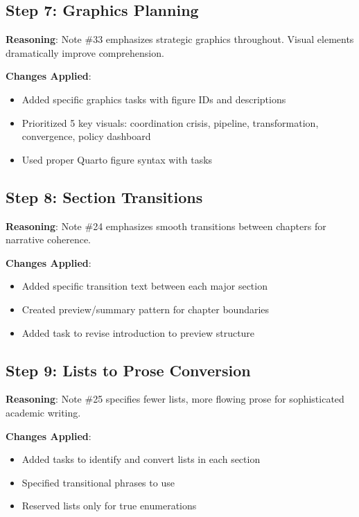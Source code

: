 \documentclass[
  11pt,
  letterpaper,
]{book}
\providecommand{\tightlist}{%
  \setlength{\itemsep}{0pt}\setlength{\parskip}{0pt}}
\begin{document}
\subsection{Step 7: Graphics Planning}\label{step-7-graphics-planning}

\textbf{Reasoning}: Note \#33 emphasizes strategic graphics throughout.
Visual elements dramatically improve comprehension.

\textbf{Changes Applied}:

\begin{itemize}
\tightlist
\item
  Added specific graphics tasks with figure IDs and descriptions
\item
  Prioritized 5 key visuals: coordination crisis, pipeline,
  transformation, convergence, policy dashboard
\item
  Used proper Quarto figure syntax with tasks
\end{itemize}

\subsection{Step 8: Section
Transitions}\label{step-8-section-transitions}

\textbf{Reasoning}: Note \#24 emphasizes smooth transitions between
chapters for narrative coherence.

\textbf{Changes Applied}:

\begin{itemize}
\tightlist
\item
  Added specific transition text between each major section
\item
  Created preview/summary pattern for chapter boundaries
\item
  Added task to revise introduction to preview structure
\end{itemize}

\subsection{Step 9: Lists to Prose
Conversion}\label{step-9-lists-to-prose-conversion}

\textbf{Reasoning}: Note \#25 specifies fewer lists, more flowing prose
for sophisticated academic writing.

\textbf{Changes Applied}:

\begin{itemize}
\tightlist
\item
  Added tasks to identify and convert lists in each section
\item
  Specified transitional phrases to use
\item
  Reserved lists only for true enumerations
\end{itemize}
\end{document}
